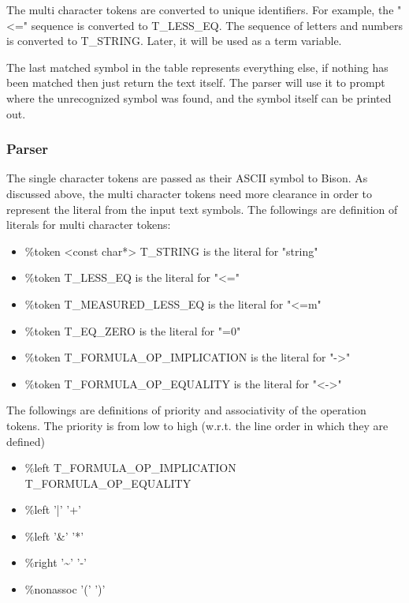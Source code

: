 \documentclass{article}
\begin{document}
	The multi character tokens are converted to unique identifiers. For example, the "<=" sequence is converted to T\_LESS\_EQ. The sequence of letters and numbers is converted to T\_STRING. Later, it will be used as a term variable.

	The last matched symbol in the table represents everything else, if nothing has been matched then just return the text itself.
	The parser will use it to prompt where the unrecognized symbol was found, and the symbol itself can be printed out.


	\subsubsection{Parser}
			The single character tokens are passed as their ASCII symbol to Bison. 
			As discussed above, the multi character tokens need more clearance in order to represent the literal from the input text symbols.
			The followings are definition of literals for multi character tokens:
			\begin{itemize}
				\item \%token <const char*> T\_STRING is the literal for "string"
				\item \%token T\_LESS\_EQ is the literal for "<="
				\item \%token T\_MEASURED\_LESS\_EQ is the literal for "<=m"
				\item \%token T\_EQ\_ZERO is the literal for "=0"
				\item \%token T\_FORMULA\_OP\_IMPLICATION is the literal for "->"
				\item \%token T\_FORMULA\_OP\_EQUALITY is the literal for "<->"
			\end{itemize}
			The followings are definitions of priority and associativity of the operation tokens. 
			The priority is from low to high (w.r.t. the line order in which they are defined)
			\begin{itemize}
				\item \%left T\_FORMULA\_OP\_IMPLICATION T\_FORMULA\_OP\_EQUALITY
				\item \%left '|' '+'
				\item \%left '\&' '*'
				\item \%right '\textasciitilde' '-'
				\item \%nonassoc '(' ')'
			\end{itemize}
\end{document}

